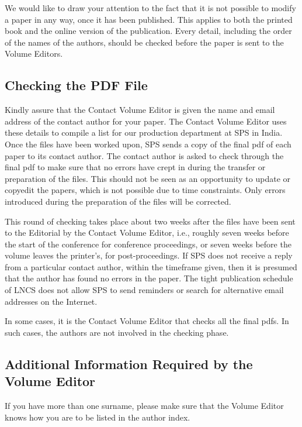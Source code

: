 \documentclass[runningheads]{llncs}
\begin{document}
We would like to draw your attention to the fact that it is not possible
to modify a paper in any way, once it has been published. This applies 
to both the printed book and the online version of the publication. 
Every detail, including the order of the names of the authors, should 
be checked before the paper is sent to the Volume Editors.

\subsection{Checking the PDF File}

Kindly assure that the Contact Volume Editor is given the name and email
address of the contact author for your paper. The Contact Volume Editor
uses these details to compile a list for our production department at
SPS in India. Once the files have been worked upon, SPS sends a copy of
the final pdf of each paper to its contact author. The contact author is
asked to check through the final pdf to make sure that no errors have
crept in during the transfer or preparation of the files. This should
not be seen as an opportunity to update or copyedit the papers, which is
not possible due to time constraints. Only errors introduced during the
preparation of the files will be corrected.

This round of checking takes place about two weeks after the files have
been sent to the Editorial by the Contact Volume Editor, i.e., roughly
seven weeks before the start of the conference for conference
proceedings, or seven weeks before the volume leaves the printer's, for
post-proceedings. If SPS does not receive a reply from a particular
contact author, within the timeframe given, then it is presumed that the
author has found no errors in the paper. The tight publication schedule
of LNCS does not allow SPS to send reminders or search for alternative
email addresses on the Internet.

In some cases, it is the Contact Volume Editor that checks all the final
pdfs. In such cases, the authors are not involved in the checking phase.

\subsection{Additional Information Required by the Volume Editor}

If you have more than one surname, please make sure that the Volume Editor
knows how you are to be listed in the author index.
\end{document}
